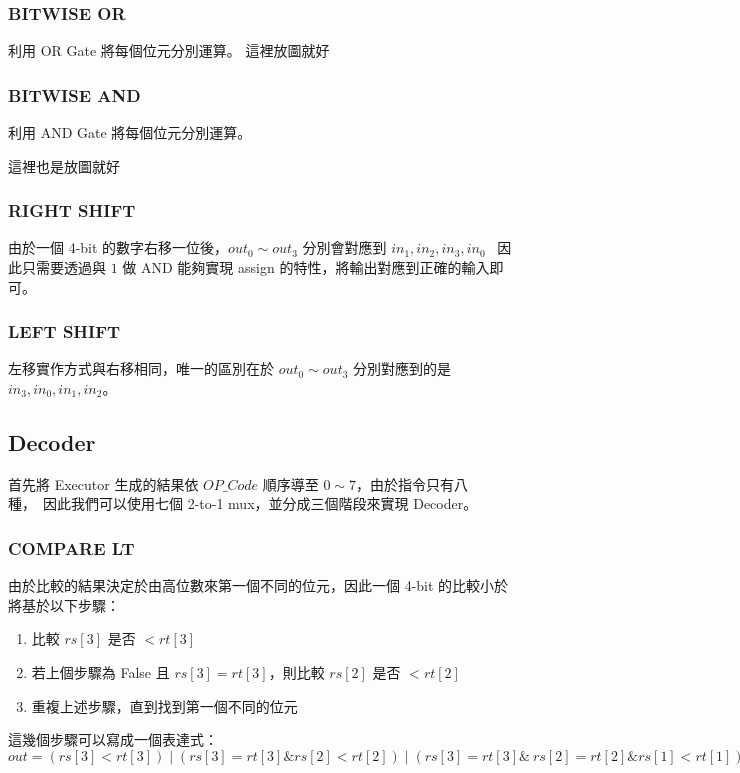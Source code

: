 \documentclass[10.5pt,compsoc,UTF8]{CjC}
\theoremstyle{mystyle}
\begin{document}
\subsubsection{BITWISE OR}
利用 OR Gate 將每個位元分別運算。
這裡放圖就好

\subsubsection{BITWISE AND}
利用 AND Gate 將每個位元分別運算。

這裡也是放圖就好

\subsubsection{RIGHT SHIFT}
由於一個 4-bit 的數字右移一位後，$out_0 \sim out_3$ 分別會對應到 $in_1, in_2, in_3, in_0$ \
因此只需要透過與 $1$ 做 AND 能夠實現 assign 的特性，將輸出對應到正確的輸入即可。

\subsubsection{LEFT SHIFT}
左移實作方式與右移相同，唯一的區別在於 $out_0 \sim out_3$ 分別對應到的是 $in_3, in_0, in_1, in_2$。

\subsection{Decoder}
首先將 Executor 生成的結果依 $OP\_Code$ 順序導至 $0 \sim 7$，由於指令只有八種，\
因此我們可以使用七個 2-to-1 mux，並分成三個階段來實現 Decoder。

\subsubsection{COMPARE LT}
由於比較的結果決定於由高位數來第一個不同的位元，因此一個 4-bit 的比較小於將基於以下步驟：
\begin{enumerate}
  \item 比較 $rs[3]$ 是否 $< rt[3]$
  \item 若上個步驟為 False 且 $rs[3] = rt[3]$，則比較 $rs[2]$ 是否 $< rt[2]$
  \item 重複上述步驟，直到找到第一個不同的位元
\end{enumerate}

這幾個步驟可以寫成一個表達式：
$out = (rs[3] < rt[3]) \mid (rs[3] = rt[3] \& rs[2] < rt[2]) \mid (rs[3] = rt[3] \& \
rs[2] = rt[2] \& rs[1] < rt[1]) \mid (rs[3] = rt[3] \& rs[2] = rt[2] \& rs[1] = rt[1] \& rs[0] < rt[0])$
\end{document}
